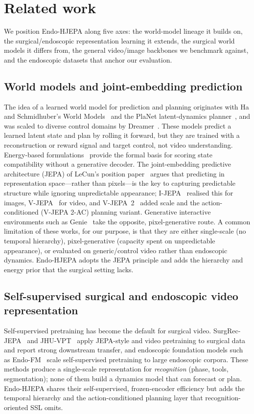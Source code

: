 \documentclass[final,3p,times,twocolumn]{elsarticle}
\begin{document}
\section{Related work}
We position Endo-HJEPA along five axes: the world-model lineage it builds on, the surgical/endoscopic representation learning it extends, the surgical world models it differs from, the general video/image backbones we benchmark against, and the endoscopic datasets that anchor our evaluation.

\subsection{World models and joint-embedding prediction}
The idea of a learned world model for prediction and planning originates with Ha and Schmidhuber's World Models~\cite{ha2018worldmodels} and the PlaNet latent-dynamics planner~\cite{hafner2019planet}, and was scaled to diverse control domains by Dreamer~\cite{hafner2023dreamer}. These models predict a learned latent state and plan by rolling it forward, but they are trained with a reconstruction or reward signal and target control, not video understanding. Energy-based formulations~\cite{lecun2006ebm} provide the formal basis for scoring state compatibility without a generative decoder. The joint-embedding predictive architecture (JEPA) of LeCun's position paper~\cite{lecun2022path} argues that predicting in representation space---rather than pixels---is the key to capturing predictable structure while ignoring unpredictable appearance; I-JEPA~\cite{assran2023ijepa} realised this for images, V-JEPA~\cite{bardes2024vjepa} for video, and V-JEPA~2~\cite{assran2025vjepa2} added scale and the action-conditioned (V-JEPA 2-AC) planning variant. Generative interactive environments such as Genie~\cite{genie2024} take the opposite, pixel-generative route. A common limitation of these works, for our purpose, is that they are either single-scale (no temporal hierarchy), pixel-generative (capacity spent on unpredictable appearance), or evaluated on generic/control video rather than endoscopic dynamics. Endo-HJEPA adopts the JEPA principle and adds the hierarchy and energy prior that the surgical setting lacks.

\subsection{Self-supervised surgical and endoscopic video representation}
Self-supervised pretraining has become the default for surgical video. SurgRec-JEPA~\cite{surgrecjepa} and JHU-VPT~\cite{jhuvpt} apply JEPA-style and video pretraining to surgical data and report strong downstream transfer, and endoscopic foundation models such as Endo-FM~\cite{endofoundation} scale self-supervised pretraining to large endoscopic corpora. These methods produce a single-scale representation for \emph{recognition} (phase, tools, segmentation); none of them build a dynamics model that can forecast or plan. Endo-HJEPA shares their self-supervised, frozen-encoder efficiency but adds the temporal hierarchy and the action-conditioned planning layer that recognition-oriented SSL omits.
\end{document}
